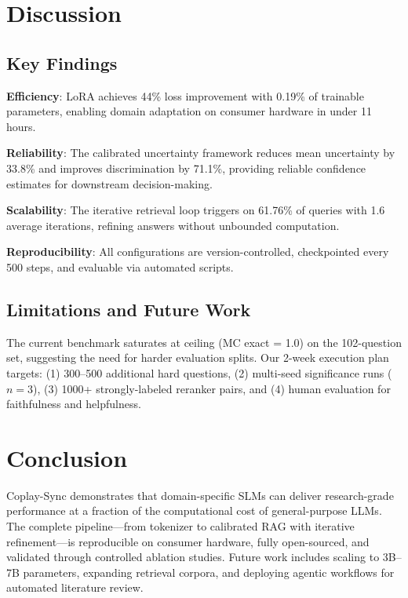 \documentclass[11pt,a4paper]{article}
\begin{document}
\section{Discussion}

\subsection{Key Findings}

\textbf{Efficiency}: LoRA achieves 44\% loss improvement with 0.19\% of trainable parameters, enabling domain adaptation on consumer hardware in under 11 hours.

\textbf{Reliability}: The calibrated uncertainty framework reduces mean uncertainty by 33.8\% and improves discrimination by 71.1\%, providing reliable confidence estimates for downstream decision-making.

\textbf{Scalability}: The iterative retrieval loop triggers on 61.76\% of queries with 1.6 average iterations, refining answers without unbounded computation.

\textbf{Reproducibility}: All configurations are version-controlled, checkpointed every 500 steps, and evaluable via automated scripts.

\subsection{Limitations and Future Work}

The current benchmark saturates at ceiling (MC exact = 1.0) on the 102-question set, suggesting the need for harder evaluation splits. Our 2-week execution plan targets: (1) 300--500 additional hard questions, (2) multi-seed significance runs ($n=3$), (3) 1000+ strongly-labeled reranker pairs, and (4) human evaluation for faithfulness and helpfulness.

\section{Conclusion}

Coplay-Sync demonstrates that domain-specific SLMs can deliver research-grade performance at a fraction of the computational cost of general-purpose LLMs. The complete pipeline---from tokenizer to calibrated RAG with iterative refinement---is reproducible on consumer hardware, fully open-sourced, and validated through controlled ablation studies. Future work includes scaling to 3B--7B parameters, expanding retrieval corpora, and deploying agentic workflows for automated literature review.
\end{document}
